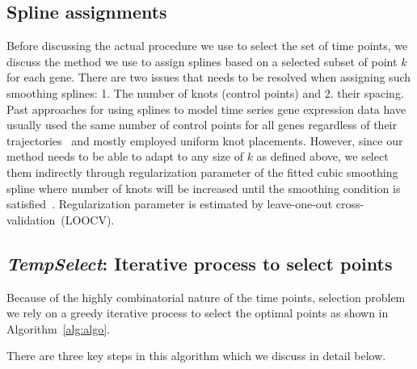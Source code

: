 \documentclass[10pt]{article}
\newcommand{\Tempselect}{\textit{TempSelect}\xspace}
\begin{document}
\subsection{Spline assignments}

Before discussing the actual procedure we use to select the set of
time points, we discuss the method we use to assign splines based on
a selected subset of point $k$ for each gene. There are two issues
that needs to be resolved when assigning such smoothing splines: 1.
The number of knots (control points) and 2. their spacing. Past
approaches for using splines to model time series gene expression
data have usually used the same number of control points for all
genes regardless of their trajectories~\cite{bar2012, singh2005} and mostly employed uniform
knot placements. However, since our method needs to be able to adapt
to any size of $k$ as defined above, we select them indirectly through
regularization parameter of the fitted cubic smoothing spline where number
of knots will be increased until the smoothing condition is
satisfied~\cite{wahba1990}. Regularization parameter is estimated by leave-one-out cross-validation~(LOOCV).

\subsection{\Tempselect: Iterative process to select points}\label{sec:mainalgo}

Because of the highly combinatorial nature of the time points, selection problem we rely on a greedy iterative process to select
the optimal points as shown in Algorithm~\ref{alg:algo}.

There are three key steps in this algorithm which we discuss in
detail below.
\end{document}

